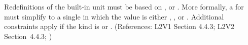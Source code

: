 Redefinitions of the built-in unit  must be based on
,  or .  More formally, a
\UnitDefinition for  must simplify to a single \Unit in which
the   value is either , , or
.  Additional constraints apply if the kind is
 or .    (References: L2V1 Section 4.4.3; L2V2
Section~4.4.3; )
